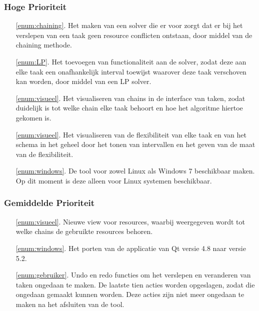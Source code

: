 \subsubsection*{Hoge Prioriteit}
\begin{itemize}
	\item[\ref{enum:chaining}.] Het maken van een solver die er voor zorgt dat er bij het verslepen van een taak geen resource conflicten ontstaan, door middel van de chaining methode.
	\item[\ref{enum:LP}.] Het toevoegen van functionaliteit aan de solver, zodat deze aan elke taak een onafhankelijk interval toewijst waarover deze taak verschoven kan worden, door middel van een LP solver.
	\item[\ref{enum:visueel}.] Het visualiseren van chains in de interface van taken, zodat duidelijk is tot welke chain elke taak behoort en hoe het algoritme hiertoe gekomen is.
	\item[\ref{enum:visueel}.] Het visualiseren van de flexibiliteit van elke taak en van het schema in het geheel door het tonen van intervallen en het geven van de maat van de flexibiliteit.
	\item[\ref{enum:windows}.] De tool voor zowel Linux als Windows 7 beschikbaar maken. Op dit moment is deze alleen voor Linux systemen beschikbaar.
\end{itemize}

\subsubsection*{Gemiddelde Prioriteit}
\begin{itemize}
	\item[\ref{enum:visueel}.] Nieuwe view voor resources, waarbij weergegeven wordt tot welke chains de gebruikte resources behoren.
	\item[\ref{enum:windows}.] Het porten van de applicatie van Qt versie 4.8 naar versie 5.2.
	\item[\ref{enum:gebruiker}.] Undo en redo functies om het verslepen en veranderen van taken ongedaan te maken. De laatste tien acties worden opgeslagen, zodat die ongedaan gemaakt kunnen worden. Deze acties zijn niet meer ongedaan te maken na het afsluiten van de tool.
\end{itemize}

